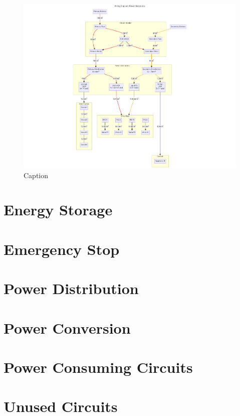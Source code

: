     \clearpage
    \begin{figure}
        \centering
        \includegraphics[scale=1]{contents/figures/wiring-power.png}
        \caption{Caption}
        \label{wiring-power}
    \end{figure}

    



\section{Energy Storage}

\section{Emergency Stop}

\section{Power Distribution}

\section{Power Conversion}

\section{Power Consuming Circuits}

\section{Unused Circuits}

